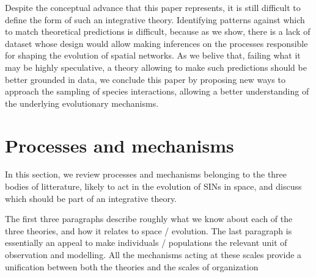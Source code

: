 \documentclass[11pt,oneside]{article}
\begin{document}
Despite the conceptual advance that this paper represents, it is still difficult
to define the form of such an integrative theory. Identifying patterns
against which to match theoretical predictions is difficult, because as we show,
there is a lack of dataset whose design would allow making inferences on the
processes responsible for shaping the evolution of spatial networks. As we
belive that, failing what it may be highly speculative, a theory allowing to
make such predictions should be better grounded in data, we conclude this paper
by proposing new ways to approach the sampling of species interactions, allowing
a better understanding of the underlying evolutionary mechanisms.

%

\section{Processes and mechanisms}

In this section, we review processes and mechanisms belonging to the three
bodies of litterature, likely to act in the evolution of SINs in space, and
discuss which should be part of an integrative theory.

The first three paragraphs describe roughly what we know about each of the three
theories, and how it relates to space / evolution. The last paragraph is
essentially an appeal to make individuals / populations the relevant unit of
observation and modelling. All the mechanisms acting at these scales provide a
unification between both the theories and the scales of organization
\end{document}
